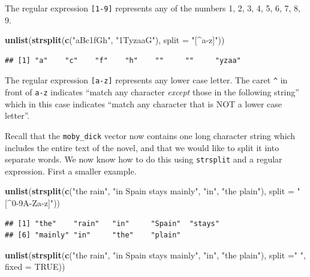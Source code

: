 \documentclass[
]{krantz}
\newenvironment{Shaded}{\begin{snugshade}}{\end{snugshade}}
\newcommand{\DataTypeTok}[1]{\textcolor[rgb]{0.13,0.29,0.53}{#1}}
\newcommand{\KeywordTok}[1]{\textcolor[rgb]{0.13,0.29,0.53}{\textbf{#1}}}
\newcommand{\NormalTok}[1]{#1}
\newcommand{\OtherTok}[1]{\textcolor[rgb]{0.56,0.35,0.01}{#1}}
\newcommand{\StringTok}[1]{\textcolor[rgb]{0.31,0.60,0.02}{#1}}
\begin{document}
The regular expression \texttt{{[}1-9{]}} represents any of the numbers 1, 2, 3, 4, 5, 6, 7, 8, 9.

\begin{Shaded}
\begin{Highlighting}[]
\KeywordTok{unlist}\NormalTok{(}\KeywordTok{strsplit}\NormalTok{(}\KeywordTok{c}\NormalTok{(}\StringTok{"aBc1fGh"}\NormalTok{, }\StringTok{"1TyzaaG"}\NormalTok{), }\DataTypeTok{split =} \StringTok{"[\^{}a{-}z]"}\NormalTok{))}
\end{Highlighting}
\end{Shaded}

\begin{verbatim}
## [1] "a"    "c"    "f"    "h"    ""     ""     "yzaa"
\end{verbatim}

The regular expression \texttt{{[}a-z{]}} represents any lower case letter. The caret \texttt{\^{}} in front of \texttt{a-z} indicates ``match any character \emph{except} those in the following string'' which in this case indicates ``match any character that is NOT a lower case letter''.

Recall that the \texttt{moby\_dick} vector now contains one long character string which includes the entire text of the novel, and that we would like to split it into separate words. We now know how to do this using \texttt{strsplit} and a regular expression. First a smaller example.

\begin{Shaded}
\begin{Highlighting}[]
\KeywordTok{unlist}\NormalTok{(}\KeywordTok{strsplit}\NormalTok{(}\KeywordTok{c}\NormalTok{(}\StringTok{"the rain"}\NormalTok{, }\StringTok{"in Spain stays mainly"}\NormalTok{, }\StringTok{"in"}\NormalTok{, }\StringTok{"the plain"}\NormalTok{), }
                \DataTypeTok{split =} \StringTok{"[\^{}0{-}9A{-}Za{-}z]"}\NormalTok{))}
\end{Highlighting}
\end{Shaded}

\begin{verbatim}
## [1] "the"    "rain"   "in"     "Spain"  "stays" 
## [6] "mainly" "in"     "the"    "plain"
\end{verbatim}

\begin{Shaded}
\begin{Highlighting}[]
\KeywordTok{unlist}\NormalTok{(}\KeywordTok{strsplit}\NormalTok{(}\KeywordTok{c}\NormalTok{(}\StringTok{"the rain"}\NormalTok{, }\StringTok{"in Spain stays mainly"}\NormalTok{, }\StringTok{"in"}\NormalTok{, }\StringTok{"the plain"}\NormalTok{), }
                \DataTypeTok{split =}\StringTok{" "}\NormalTok{, }\DataTypeTok{fixed =} \OtherTok{TRUE}\NormalTok{))}
\end{Highlighting}
\end{Shaded}
\end{document}
